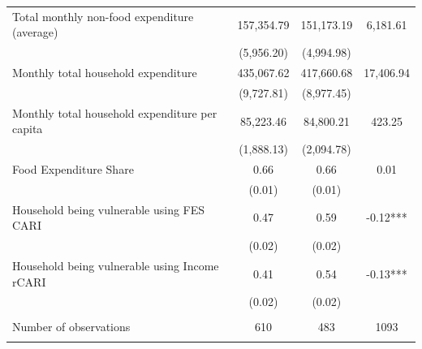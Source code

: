 \begin{tabular}{@{\extracolsep{5pt}}lccc}
Total monthly non-food expenditure (average)   & 157,354.79    & 151,173.19    & 6,181.61   \\
 & (5,956.20)  & (4,994.98)  &  \\ [1ex]
Monthly total household expenditure   & 435,067.62    & 417,660.68    & 17,406.94   \\
 & (9,727.81)  & (8,977.45)  &  \\ [1ex]
Monthly total household expenditure per capita   & 85,223.46    & 84,800.21    & 423.25   \\
 & (1,888.13)  & (2,094.78)  &  \\ [1ex]
Food Expenditure Share   & 0.66    & 0.66    & 0.01   \\
 & (0.01)  & (0.01)  &  \\ [1ex]
Household being vulnerable using FES CARI   & 0.47    & 0.59    & -0.12***   \\
 & (0.02)  & (0.02)  &  \\ [1ex]
Household being vulnerable using Income rCARI   & 0.41    & 0.54    & -0.13***   \\
 & (0.02)  & (0.02)  &  \\ [1ex]
\hline \\[-1.8ex]
Number of observations  & 610   & 483  & 1093  \\
\hline \hline \\[-1.8ex]

\end{tabular}
